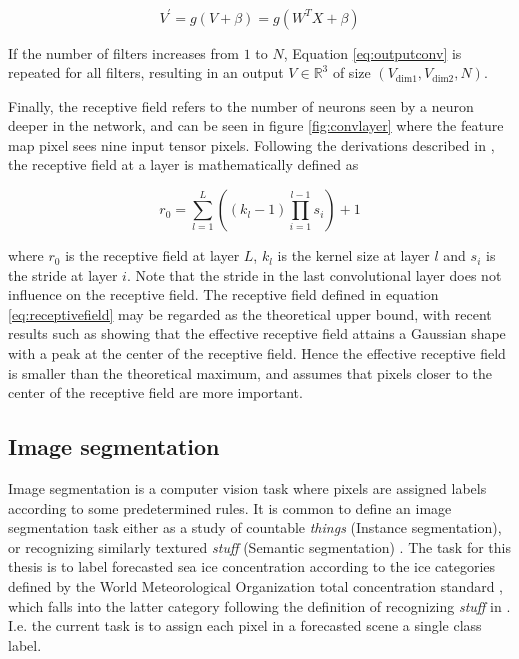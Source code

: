 \documentclass[../main/thesis.tex]{subfiles}
\begin{document}
\begin{equation}
    \label{eq:outputconv}
    V^\prime = g(V + \beta) = g(W^TX + \beta)
\end{equation}

If the number of filters increases from $1$ to $N$, Equation \ref{eq:outputconv} is repeated for all filters, resulting in an output $V \in{\mathbb{R}^3}$ of size $(V_\text{dim1}, V_\text{dim2}, N)$.

Finally, the receptive field refers to the number of neurons seen by a neuron deeper in the network, and can be seen in figure \ref{fig:convlayer} where the feature map pixel sees nine input tensor pixels. Following the derivations described in \citet{Araujo2019}, the receptive field at a layer is mathematically defined as

\begin{equation}
    \label{eq:receptivefield}
    r_0 = \sum_{l=1}^L\left(\left(k_l - 1\right)\prod_{i=1}^{l-1}s_i\right) + 1
\end{equation}

where $r_0$ is the receptive field at layer $L$, $k_l$ is the kernel size at layer $l$ and $s_i$ is the stride at layer $i$. Note that the stride in the last convolutional layer does not influence on the receptive field. The receptive field defined in equation \ref{eq:receptivefield} may be regarded as the theoretical upper bound, with recent results such as \citet{Luo2017} showing that the effective receptive field attains a Gaussian shape with a peak at the center of the receptive field. Hence the effective receptive field is smaller than the theoretical maximum, and assumes that pixels closer to the center of the receptive field are more important.

\subsection{Image segmentation}
\label{sec:image-segmentation}
Image segmentation is a computer vision task where pixels are assigned labels according to some predetermined rules. It is common to define an image segmentation task either as a study of countable \textit{things} (Instance segmentation), or recognizing similarly textured \textit{stuff} (Semantic segmentation) \citep{Kirillov2018}. The task for this thesis is to label forecasted sea ice concentration according to the ice categories defined by the World Meteorological Organization total concentration standard \citep{WMO2014}, which falls into the latter category following the definition of recognizing \textit{stuff} in \citet{Adelson2001}. I.e. the current task is to assign each pixel in a forecasted scene a single class label.
\end{document}

